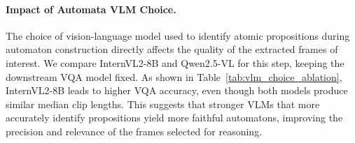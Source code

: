 \documentclass[letterpaper]{article} %
\begin{document}
        \paragraph{Impact of Automata VLM Choice.}
        The choice of vision-language model used to identify atomic propositions during automaton construction directly affects the quality of the extracted frames of interest. We compare InternVL2-8B and Qwen2.5-VL for this step, keeping the downstream VQA model fixed. As shown in Table~\ref{tab:vlm_choice_ablation}, InternVL2-8B leads to higher VQA accuracy, even though both models produce similar median clip lengths. This suggests that stronger VLMs that more accurately identify propositions yield more faithful automatons, improving the precision and relevance of the frames selected for reasoning.


    \begin{table}[t]
        \centering
        \caption{\textbf{Impact of VLM backbone choice on accuracy (\%).} Using InternVL2-8B for automaton construction results in the highest accuracy when evaluated with GPT-4o.}
        \label{tab:vlm_choice_ablation}
    \end{table}
\end{document}

